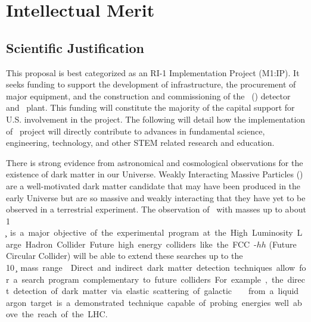 \section{Intellectual Merit}

\subsection{Scientific Justification}


This proposal  is best categorized as an RI-1 Implementation Project (M1:IP). It seeks funding to support the development of infrastructure, the procurement of major equipment, and the construction and commissioning of the \DSk\ (\DSks) detector and \Urania\ plant.  This funding will constitute the majority of the capital support for U.S. involvement in the project.  The following will detail how the implementation of \DSk\ project will directly contribute to advances in fundamental science, engineering, technology, and other STEM related research and education.  

There is strong evidence from astronomical and cosmological observations for the existence of dark matter in our Universe. Weakly Interacting Massive Particles (\WIMPs) are a well-motivated dark matter candidate that may have been produced in the early Universe but are so massive and weakly interacting that they have yet to be observed in a terrestrial experiment. The observation of \WIMPs\ with masses up to about 1 \si{\TeV\per\square\c} is a major objective of the experimental program at the High Luminosity Large Hadron Collider. Future high energy colliders like the FCC-$hh$ (Future Circular Collider) will be able to extend these searches up to the  \SI{10}{\TeV\per\square\c} mass range~\cite{CERN:2017cq}. Direct and indirect dark matter detection techniques allow for a search program complementary to future colliders. For example, the direct detection of dark matter via elastic scattering of galactic \WIMPs\ from a liquid argon target is a demonstrated technique capable of probing energies well above the reach of the LHC.

